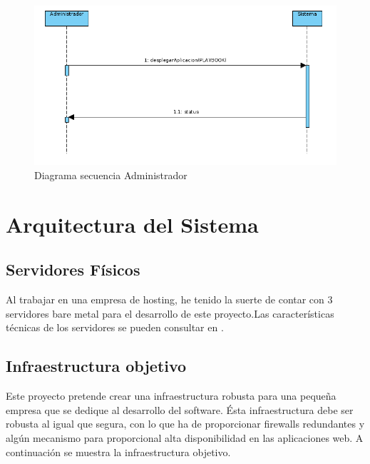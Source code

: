 		\begin{figure}[!hbt]
			\centering
			\includegraphics[scale=0.4]{imagenes/Analisis/diagrama_secuencia_administrador_2.png}
			\caption[Diagrama secuencia Desarrollador]{Diagrama secuencia Administrador \cite{diagramasecuencia:online}}
			\label{Diagrama secuencia}
		\end{figure}
		
	
	
\section{Arquitectura del Sistema}
	\subsection{Servidores Físicos}
		\begin{paragraph}
			Al trabajar en una empresa de hosting, he tenido la suerte de contar con 3 servidores bare metal para el desarrollo de este proyecto.Las características técnicas de los servidores se pueden consultar en .
		\end{paragraph}
	\subsection{Infraestructura objetivo}
		\begin{paragraph}
			Este proyecto pretende crear una infraestructura robusta para una pequeña empresa que se dedique al desarrollo del software. Ésta infraestructura debe ser robusta al igual que segura, con lo que ha de proporcionar firewalls redundantes y algún mecanismo para proporcional alta disponibilidad en las aplicaciones web.  A continuación se muestra la infraestructura objetivo.
		\end{paragraph}
	
